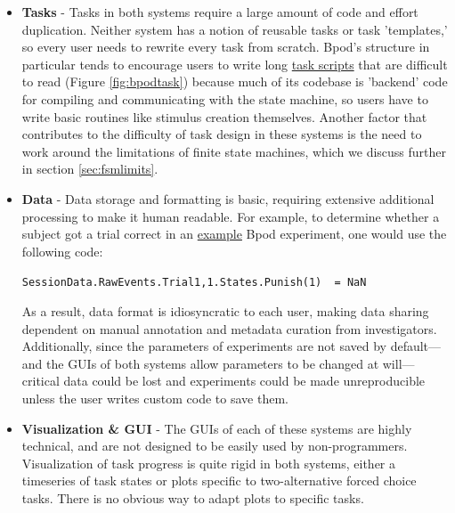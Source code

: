 \begin{itemize}[resume*, before=\vspace{0pt}, after=\vspace{\baselineskip}]%
    \item \textbf{Tasks} - Tasks in both systems require a large amount of code and effort duplication. Neither system has a notion of reusable tasks or task 'templates,' so every user needs to rewrite every task from scratch. Bpod's structure in particular tends to encourage users to write long \href{https://github.com/sanworks/Bpod_Gen2/blob/master/Examples/Protocols/AnalogSound2AFC/AnalogSound2AFC.m}{task scripts} that are difficult to read (Figure \ref{fig:bpodtask}) because much of its codebase is 'backend' code for compiling and communicating with the state machine, so users have to write basic routines like stimulus creation themselves. Another factor that contributes to the difficulty of task design in these systems is the need to work around the limitations of finite state machines, which we discuss further in section \ref{sec:fsmlimits}.
    \item \textbf{Data} - Data storage and formatting is basic, requiring extensive additional processing to make it human readable. For example, to determine whether a subject got a trial correct in an \href{https://github.com/sanworks/Bpod_Gen2/blob/master/Examples/Protocols/Light/Light2AFC/Light2AFC.m}{example} Bpod experiment, one would use the following code:
    
    \texttt{SessionData.RawEvents.Trial{1,1}.States.Punish(1) ~= NaN}
    
    As a result, data format is idiosyncratic to each user, making data sharing dependent on manual annotation and metadata curation from investigators. Additionally, since the parameters of experiments are not saved by default---and the GUIs of both systems allow parameters to be changed at will---critical data could be lost and experiments could be made unreproducible unless the user writes custom code to save them.
    \clearpage
    \item \textbf{Visualization \& GUI} - The GUIs of each of these systems are highly technical, and are not designed to be easily used by non-programmers. Visualization of task progress is quite rigid in both systems, either a timeseries of task states or plots specific to two-alternative forced choice tasks. There is no obvious way to adapt plots to specific tasks.
\end{itemize}

